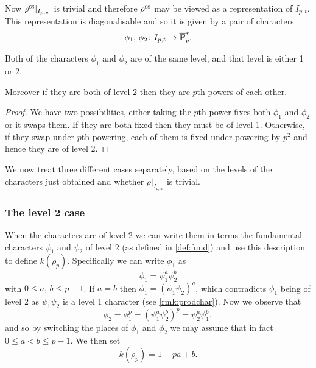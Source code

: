 \documentclass[a4paper,12pt]{article}
\begin{document}
Now $\rho^\text{ss}|_{I_{p,w}}$ is trivial and therefore $\rho^\text{ss}$ may be viewed as a representation of $I_{p,t}$.
This representation is diagonalisable and so it is given by a pair of characters
\[
\phi_1,\,\phi_2\colon I_{p,t} \to \overline{\mathbf{F}}_p^*.
\]

\begin{prop}
Both of the characters $\phi_1$ and $\phi_2$ are of the same level, and that level is either 1 or 2.

Moreover if they are both of level 2 then they are $p$th powers of each other.
\end{prop}
\begin{proof}

We have two possibilities, either taking the $p$th power fixes both $\phi_1$ and $\phi_2$ or it swaps them.
If they are both fixed then they must be of level 1.
Otherwise, if they swap under $p$th powering, each of them is fixed under powering by $p^2$ and hence they are of level 2.
\end{proof}

We now treat three different cases separately, based on the levels of the characters just obtained and whether $\rho|_{I_{p,w}}$ is trivial.


\subsubsection{The level 2 case}\label{sec:l2}
When the characters are of level 2 we can write them in terms the fundamental characters $\psi_1$ and $\psi_2$ of level 2 (as defined in \cref{def:fund}) and use this description to define $k(\rho_p)$.
Specifically we can write $\phi_1$ as
\[
\phi_1 = \psi_1^a\psi_2^b
\]
with $0\le a,\,b\le p-1$.
If $a = b$ then $\phi_1 = (\psi_1 \psi_2)^a$, which contradicts $\phi_1$ being of level 2 as $\psi_1\psi_2$ is a level 1 character (see \cref{rmk:prodchar}).
Now we observe that
\[
\phi_2 = \phi_1^p = (\psi_1^a\psi_2^b)^p = \psi_2^a\psi_1^b,
\]
and so by switching the places of $\phi_1$ and $\phi_2$ we may assume that in fact $0\le a < b\le p-1$.
We then set
\begin{equation}\label{eq:l2}
k(\rho_p) = 1 + pa + b.
\end{equation}
\end{document}
